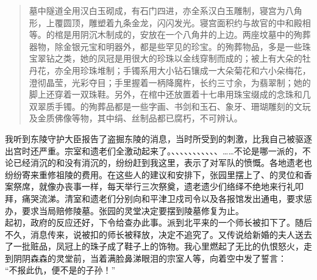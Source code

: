 \begin{quote}
	墓中隧道全用汉白玉砌成，有石门四进，亦全系汉白玉雕制，寝宫为八角形，上覆圆顶，雕塑着九条金龙，闪闪发光。寝宫面积约与故官的中和殿相等。的棺是用阴沉木制成的，安放在一个八角井的上边。两座坟墓中的殉葬器物，除金银元宝和明器外，都是些罕见的珍宝。的殉葬物品，多是一些珠宝翠钻之类，她的凤冠是用很大的珍珠以金线穿制而成的；被上有大朵的牡丹花，亦全用珍珠堆制；手镯系用大小钻石镶成一大朵菊花和六小朵梅花，澄彻晶莹，光彩夺目；手里握着一柄降魔杵，长约三寸余，为翡翠制；她的脚上还穿着一双珠鞋。另外，在棺中还放置着十七串用珠宝缀成的念珠和几双翠质手镯。的殉葬品都是一些字画、书剑和玉石、象牙、珊瑚雕刻的文玩及金质佛像等物，其中绢、丝制品都已腐朽，不可辨认。\\
\end{quote}

我听到东陵守护大臣报告了盗掘东陵的消息，当时所受到的刺激，比我自己被驱逐出宫时还严重。宗室和遗老们全激动起来了。、、、、、、、、、、、……不论是哪一派的，不论已经消沉的和没有消沉的，纷纷赶到我这里，表示了对军队的愤慨。各地遗老也纷纷寄来重修祖陵的费用。在这些人的建议和安排下，张园里摆上了、的灵位和香案祭席，就像办丧事一样，每天举行三次祭奠，遗老遗少们络绎不绝地来行礼叩拜，痛哭流涕。清室和遗老们分别向和平津卫戍司令以及各报馆发出通电，要求惩办，要求当局赔修陵墓。张园的灵堂决定要摆到陵墓修复为止。\\

起初，政府的反应还好，下令给查办此事。派到北平来的一个师长被扣下了。随后不久，消息传来，说被扣的师长被释放，决定不追究了。又传说给新婚的夫人送去了一批赃品，凤冠上的珠子成了鞋子上的饰物。我心里燃起了无比的仇恨怒火，走到阴阴森森的灵堂前，当着满脸鼻涕眼泪的宗室人等，向着空中发了誓言：\\

“不报此仇，便不是的子孙！”\\

